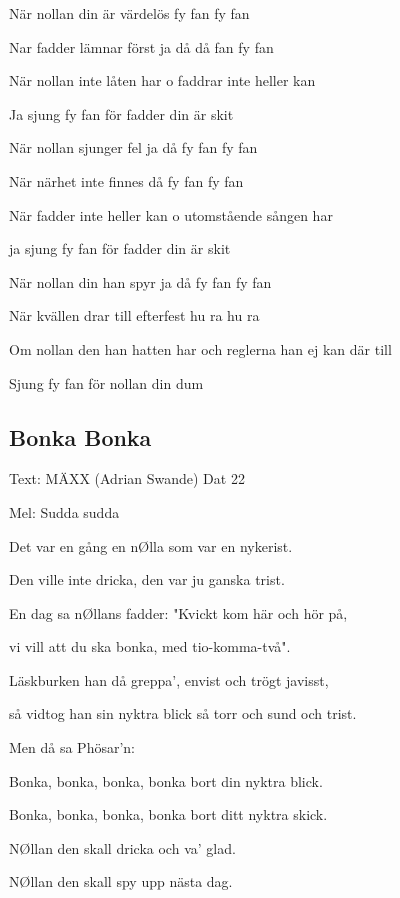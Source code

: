 När nollan din är värdelös fy fan fy fan 

Nar fadder lämnar först ja då då fan fy fan\bigskip

När nollan inte låten har o faddrar inte heller kan

Ja sjung fy fan för fadder din är skit\bigskip

När nollan sjunger fel ja då fy fan fy fan 

När närhet inte finnes då fy fan fy fan \bigskip

När fadder inte heller kan o utomstående sången har 

ja sjung fy fan för fadder din är skit\bigskip

När nollan din han spyr ja då fy fan fy fan

När kvällen drar till efterfest hu ra hu ra\bigskip

Om nollan den han hatten har och reglerna han ej kan där till 

Sjung fy fan för nollan din dum\bigskip

\subsection{\textbf{Bonka Bonka}}

Text: MÄXX (Adrian Swande) Dat 22

Mel: Sudda sudda \bigskip



Det var en gång en nØlla som var en nykerist.

Den ville inte dricka, den var ju ganska trist.

En dag sa nØllans fadder: "Kvickt kom här och hör på,

vi vill att du ska bonka, med tio-komma-två".\bigskip



Läskburken han då greppa', envist och trögt javisst,

så vidtog han sin nyktra blick så torr och sund och trist. \bigskip



Men då sa Phösar'n:\bigskip



Bonka, bonka, bonka, bonka bort din nyktra blick.

Bonka, bonka, bonka, bonka bort ditt nyktra skick.

NØllan den skall dricka och va' glad.



NØllan den skall spy upp nästa dag.\bigskip

